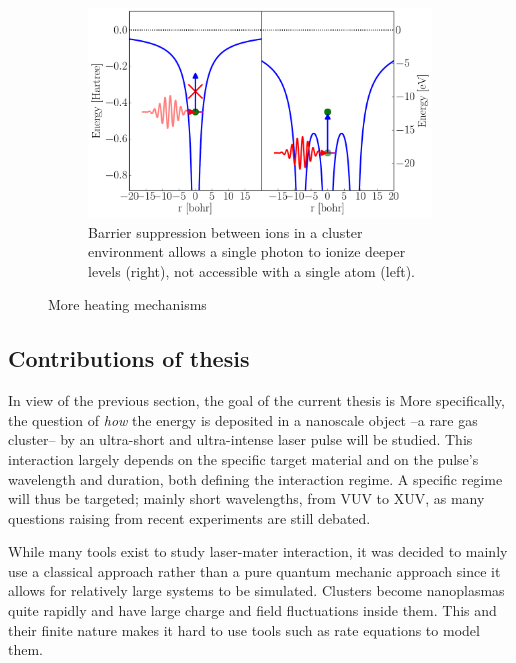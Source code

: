 \begin{figure}
    \begin{subfigure}{\figurewidth}
        \centering
        \includegraphics[width=\textwidth]{figures/heating_barrier_sup}
        \caption{Barrier suppression between ions in a cluster environment allows
                 a single photon to ionize deeper levels (right), not accessible
                 with a single atom (left).}
        \label{fig:heating:barrier}
    \end{subfigure}
 \caption{More heating mechanisms}
 \label{fig:heating}
\end{figure}



\clearpage
\subsection{Contributions of thesis}

In view of the previous section, the goal of the current thesis is
More specifically, the
question of \textit{how} the energy is deposited in a nanoscale object
--a rare gas cluster-- by an
ultra-short and ultra-intense laser pulse will be studied. This interaction
largely depends on the specific target material and on the pulse's wavelength
and duration, both
defining the interaction regime. A specific regime will
thus be targeted; mainly short wavelengths, from VUV to XUV, as many questions
raising from recent experiments are still debated.

While many tools exist to study laser-mater interaction, it was decided to
mainly use a classical approach rather than a pure quantum mechanic approach
since it allows for relatively large systems to be simulated. Clusters become
nanoplasmas quite rapidly and have large charge and field fluctuations inside
them. This and their finite nature makes it hard to use tools such as rate
equations to model them.

